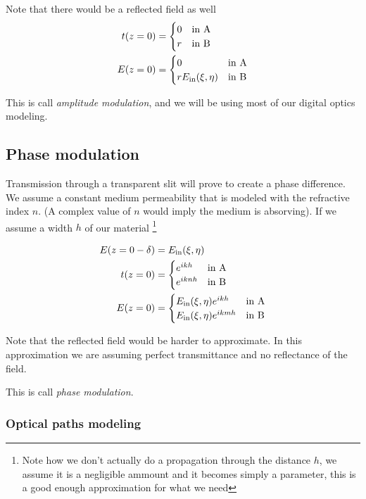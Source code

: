 \documentclass[../main/main.tex]{subfiles}
\begin{document}
Note that there would be a reflected field as well
\begin{align*}
t(z=0) &= \begin{cases}
0 &\textrm{in A}\\
r &\textrm{in B}
\end{cases}\\
E(z=0) &= \begin{cases}
0 &\textrm{in A}\\
r E_{\textrm{in}}(\xi, \eta) &\textrm{in B}
\end{cases}
\end{align*}




This is call \emph{amplitude modulation}, and we will be using most of our digital optics modeling.


\subsection{Phase modulation}

Transmission through a transparent slit will prove to create a phase difference. We assume a constant medium permeability that is modeled with the refractive index $n$. (A complex value of $n$ would imply the medium is absorving). If we assume a width $h$ of our material \footnote{Note how we don't actually do a propagation through the distance $h$, we assume it is a negligible ammount and it becomes simply a parameter, this is a good enough approximation for what we need}

\begin{align*}
E(z=0-\delta) &= E_{\textrm{in}}(\xi, \eta) \\
t(z=0) &= \begin{cases}
e^{ikh} &\textrm{in A}\\
e^{iknh} &\textrm{in B}
\end{cases}\\
E(z=0) &= \begin{cases}
E_{\textrm{in}}(\xi, \eta) e^{ikh} &\textrm{in A}\\
E_{\textrm{in}}(\xi, \eta) e^{ikmh} &\textrm{in B}
\end{cases}
\end{align*}

Note that the reflected field would be harder to approximate. In this approximation we are assuming perfect transmittance and no reflectance of the field.



This is call \emph{phase modulation}.

\subsubsection{Optical paths modeling}
\end{document}
